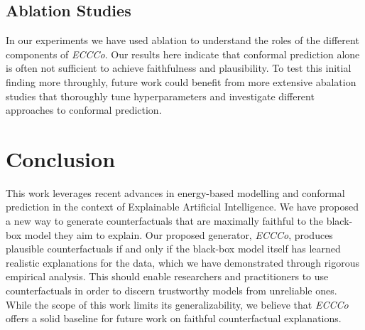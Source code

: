 \subsection{Ablation Studies}

In our experiments we have used ablation to understand the roles of the different components of \textit{ECCCo}. Our results here indicate that conformal prediction alone is often not sufficient to achieve faithfulness and plausibility. To test this initial finding more throughly, future work could benefit from more extensive abalation studies that thoroughly tune hyperparameters and investigate different approaches to conformal prediction. 

\section{Conclusion}

This work leverages recent advances in energy-based modelling and conformal prediction in the context of Explainable Artificial Intelligence. We have proposed a new way to generate counterfactuals that are maximally faithful to the black-box model they aim to explain. Our proposed generator, \textit{ECCCo}, produces plausible counterfactuals if and only if the black-box model itself has learned realistic explanations for the data, which we have demonstrated through rigorous empirical analysis. This should enable researchers and practitioners to use counterfactuals in order to discern trustworthy models from unreliable ones. While the scope of this work limits its generalizability, we believe that \textit{ECCCo} offers a solid baseline for future work on faithful counterfactual explanations.